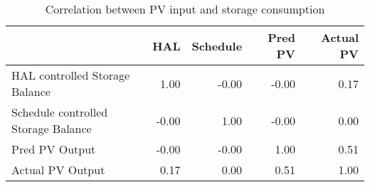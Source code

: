 \begin{table}
\centering
\caption{Correlation between PV input and storage consumption}
\label{t/res/real}
\begin{tabular}{lrrrr}
\toprule
{} &   HAL & Schedule & Pred PV & Actual PV \\
\midrule
HAL controlled Storage Balance      &  1.00 &    -0.00 &   -0.00 &      0.17 \\
Schedule controlled Storage Balance & -0.00 &     1.00 &   -0.00 &      0.00 \\
Pred PV Output                      & -0.00 &    -0.00 &    1.00 &      0.51 \\
Actual PV Output                    &  0.17 &     0.00 &    0.51 &      1.00 \\
\bottomrule
\end{tabular}
\end{table}
